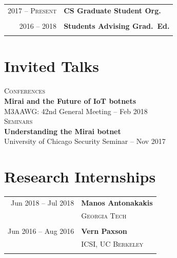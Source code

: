 \documentclass[10pt]{article} %
\begin{document}
{\begin{minipage}[t]{0.44\textwidth}
\begin{tabular}{rl}
2017 -- \textsc{Present} & \textbf{CS Graduate Student Org.}\\
& \\

2016 -- 2018 & \textbf{Students Advising Grad.\ Ed.}\\
& \\


\end{tabular}


\section{Invited Talks} 

\textsc{Conferences}\\
\hspace*{15pt} \textbf{Mirai and the Future of IoT botnets}\\
\hspace*{15pt} M3AAWG: 42nd General Meeting -- Feb 2018 \\

\textsc{Seminars}\\
\hspace*{15pt} \textbf{Understanding the Mirai botnet} \\
\hspace*{15pt} University of Chicago Security Seminar -- Nov 2017 \\


\section{Research Internships} 

\begin{tabular}{rl}
Jun 2018 -- Jul 2018 & \textbf{Manos Antonakakis}\\
& \textsc{Georgia Tech}\\
&\\

Jun 2016 -- Aug 2016 & \textbf{Vern Paxson}\\
& \textsc{ICSI, UC Berkeley}\\
& \\


\end{tabular}
\end{minipage}}
\end{document}
